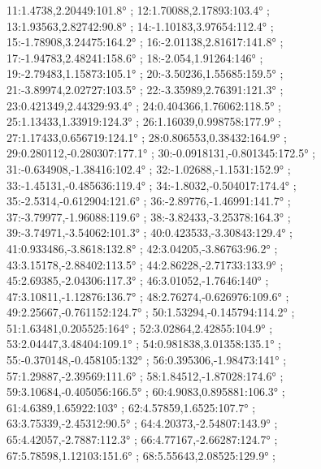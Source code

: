 \documentclass[a4paper,10pt,ngerman]{scrartcl}
\begin{document}
\begin{algorithm}[H]
\begin{figure}[!h]
{                11:1.4738,2.20449:101.8° ;
                12:1.70088,2.17893:103.4° ;
                13:1.93563,2.82742:90.8° ;
                14:-1.10183,3.97654:112.4° ;
                15:-1.78908,3.24475:164.2° ;
                16:-2.01138,2.81617:141.8° ;
                17:-1.94783,2.48241:158.6° ;
                18:-2.054,1.91264:146° ;
                19:-2.79483,1.15873:105.1° ;
                20:-3.50236,1.55685:159.5° ;
                21:-3.89974,2.02727:103.5° ;
                22:-3.35989,2.76391:121.3° ;
                23:0.421349,2.44329:93.4° ;
                24:0.404366,1.76062:118.5° ;
                25:1.13433,1.33919:124.3° ;
                26:1.16039,0.998758:177.9° ;
                27:1.17433,0.656719:124.1° ;
                28:0.806553,0.38432:164.9° ;
                29:0.280112,-0.280307:177.1° ;
                30:-0.0918131,-0.801345:172.5° ;
                31:-0.634908,-1.38416:102.4° ;
                32:-1.02688,-1.1531:152.9° ;
                33:-1.45131,-0.485636:119.4° ;
                34:-1.8032,-0.504017:174.4° ;
                35:-2.5314,-0.612904:121.6° ;
                36:-2.89776,-1.46991:141.7° ;
                37:-3.79977,-1.96088:119.6° ;
                38:-3.82433,-3.25378:164.3° ;
                39:-3.74971,-3.54062:101.3° ;
                40:0.423533,-3.30843:129.4° ;
                41:0.933486,-3.8618:132.8° ;
                42:3.04205,-3.86763:96.2° ;
                43:3.15178,-2.88402:113.5° ;
                44:2.86228,-2.71733:133.9° ;
                45:2.69385,-2.04306:117.3° ;
                46:3.01052,-1.7646:140° ;
                47:3.10811,-1.12876:136.7° ;
                48:2.76274,-0.626976:109.6° ;
                49:2.25667,-0.761152:124.7° ;
                50:1.53294,-0.145794:114.2° ;
                51:1.63481,0.205525:164° ;
                52:3.02864,2.42855:104.9° ;
                53:2.04447,3.48404:109.1° ;
                54:0.981838,3.01358:135.1° ;
                55:-0.370148,-0.458105:132° ;
                56:0.395306,-1.98473:141° ;
                57:1.29887,-2.39569:111.6° ;
                58:1.84512,-1.87028:174.6° ;
                59:3.10684,-0.405056:166.5° ;
                60:4.9083,0.895881:106.3° ;
                61:4.6389,1.65922:103° ;
                62:4.57859,1.6525:107.7° ;
                63:3.75339,-2.45312:90.5° ;
                64:4.20373,-2.54807:143.9° ;
                65:4.42057,-2.7887:112.3° ;
                66:4.77167,-2.66287:124.7° ;
                67:5.78598,1.12103:151.6° ;
                68:5.55643,2.08525:129.9° ;
}
\end{figure}
\end{algorithm}
\end{document}
